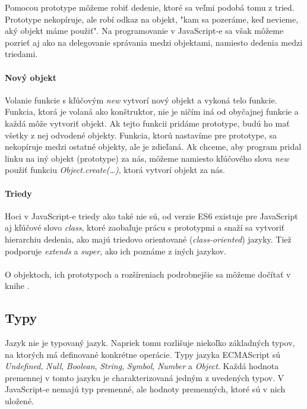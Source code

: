 Pomocou prototype môžeme robiť dedenie, ktoré sa veľmi podobá tomu z tried. Prototype nekopíruje, ale robí odkaz na objekt, "kam sa pozeráme, keď nevieme, aký objekt máme použiť".
Na programovanie v JavaScript-e sa však môžeme pozrieť aj ako na delegovanie správania medzi objektami, namiesto dedenia medzi triedami.

\paragraph{Nový objekt}
Volanie funkcie s kľúčovým \emph{new} vytvorí nový objekt a vykoná telo funkcie. Funkcia, ktorá je volaná ako konštruktor, nie je ničím iná od obyčajnej funkcie a každá môže vytvoriť objekt.
Ak tejto funkcii pridáme prototype, budú ho mať všetky z nej odvodené objekty. Funkcia, ktorú nastavíme pre prototype, sa nekopíruje medzi ostatné objekty, ale je zdieľaná.
Ak chceme, aby program pridal linku na iný objekt (prototype) za nás, môžeme namiesto kľúčového slova \emph{new} použiť funkciu \emph{Object.create(\ldots)}, ktorá vytvorí objekt za nás.

\paragraph{Triedy}
Hoci v JavaScript-e triedy ako také nie sú, od verzie ES6 existuje pre JavaScript aj kľúčové slovo \emph{class}, ktoré zaobaľuje prácu s prototypmi a snaží sa vytvoriť hierarchiu dedenia, ako majú triedovo orientované (\emph{class-oriented}) jazyky. Tiež podporuje \emph{extends} a \emph{super}, ako ich poznáme z iných jazykov.

\paragraph{}
O objektoch, ich prototypoch a rozšíreniach podrobnejšie sa môžeme dočítať v knihe \cite[this \& Object Prototypes]{youDontKnowJS3}.

\subsection{Typy}
Jazyk \JS{} nie je typovaný jazyk. Napriek tomu rozlišuje niekoľko základných typov, na ktorých má definované konkrétne operácie. Typy jazyka ECMAScript sú \emph{Undefined}, \emph{Null}, \emph{Boolean}, \emph{String}, \emph{Symbol}, \emph{Number} a \emph{Object}. Každá hodnota premennej v tomto jazyku je charakterizovaná jedným z uvedených typov. V JavaScript-e nemajú typ premenné, ale hodnoty premenných, ktoré sú v nich uložené. 

